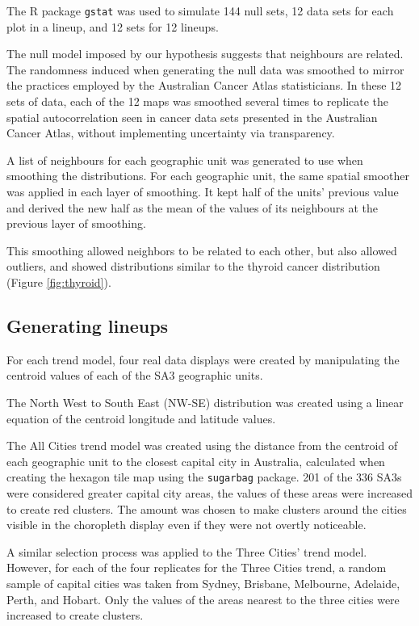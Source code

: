 \documentclass[times, doublespace]{anzsauth}
\begin{document}
The R package  \texttt{gstat} \citep{gstat} was used to
simulate 144 null sets, 12 data sets for each plot in a lineup, and 12
sets for 12 lineups.

The null model imposed by our hypothesis suggests that neighbours are
related. The randomness induced when generating the null data was
smoothed to mirror the practices employed by the Australian Cancer Atlas
statisticians. In these 12 sets of data, each of the 12 maps was
smoothed several times to replicate the spatial autocorrelation seen in
cancer data sets presented in the Australian Cancer Atlas, without
implementing uncertainty via transparency.

A list of neighbours for each geographic unit was generated to use when
smoothing the distributions. For each geographic unit, the same spatial
smoother was applied in each layer of smoothing. It kept half of the
units' previous value and derived the new half as the mean of the
values of its neighbours at the previous layer of smoothing.

This smoothing allowed neighbors to be related to each other, but also
allowed outliers, and showed distributions similar to the thyroid cancer
distribution (Figure \ref{fig:thyroid}).

\subsection{Generating lineups}\label{generating-lineups}

For each trend model, four real data displays were created by
manipulating the centroid values of each of the SA3 geographic units.

The North West to South East (NW-SE) distribution was created using a
linear equation of the centroid longitude and latitude values.

The All Cities trend model was created using the distance from the
centroid of each geographic unit to the closest capital city in
Australia, calculated when creating the hexagon tile map using the
 \texttt{sugarbag} \citep{sugarbag} package. 201 of the 336 SA3s
were considered greater capital city areas, the values of these areas
were increased to create red clusters. The amount was chosen to make
clusters around the cities visible in the choropleth display even if
they were not overtly noticeable.

A similar selection process was applied to the Three Cities' trend
model. However, for each of the four replicates for the Three Cities
trend, a random sample of capital cities was taken from Sydney,
Brisbane, Melbourne, Adelaide, Perth, and Hobart. Only the values of the
areas nearest to the three cities were increased to create clusters.
\end{document}
